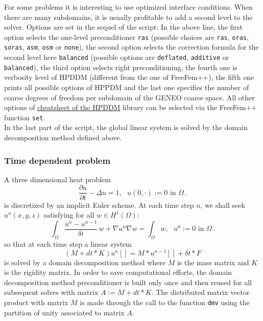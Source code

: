 For some problems it is interesting to use optimized interface conditions. When there are many subdomains, it is usually profitable to add a second level to the solver. Options are set in the sequel of the script:
\lstinput[linerange=OsmTwolevel-OsmTwolevelEnd]{\parallelScript}
 In the above line, the first option selects the one-level preconditioner \texttt{ras} (possible choices are \texttt{ras}, \texttt{oras}, \texttt{soras}, \texttt{asm}, \texttt{osm} or \texttt{none}), the second option selects the correction formula for the second level here \texttt{balanced} (possible options are \texttt{deflated}, \texttt{additive} or \texttt{balanced}), the third option selects right preconditioning, the fourth one is verbosity level of HPDDM (different from the one of FreeFem++), the fifth one prints all possible options of HPPDM and the last one specifies the number of coarse degrees of freedom per subdomain of the GENEO coarse space. All other options of \href{https://github.com/hpddm/hpddm/blob/master/doc/cheatsheet.pdf}{cheatsheet of the HPDDM} \cite{Jolivet:2014:HPD} library can be selected via the FreeFem++ function \texttt{set}.\\


In the last part of the script, the global linear system is solved by the domain decomposition method defined above. 
\lstinput[linerange=SolvePlot-SolvePlotEnd]{\parallelScript}

\subsubsection{Time dependent problem} %
\label{sub:time_dependent_problem}
\begin{example}
	A three dimensional heat problem
\[
\frac{\partial u}{\partial t} - \Delta u = 1,\ \ \ u(0,\cdot) := 0 \text{ in }\Omega\,.
\]	
is discretized by an implicit Euler scheme. At each time step $n$, we shall seek $u^n(x,y,z)$ satisfying for all $w\in H^1(\Omega)$:
\[
\int_\Omega \frac{u^n-u^{n-1}}{\delta t}\,w + \nabla u^n \nabla w = \int_\Omega w ,\ \ \ u^0 := 0 \text{ in }\Omega\,.
\]
	 so that at each time step a linear system
\[
(M+dt*K) u^n[] = M*u^{n-1}[] + \delta t*F
\]	
is solved by a domain decomposition method where $M$ is the mass matrix and $K$ is the rigidity matrix. In order to save computational efforts, the domain decomposition method preconditioner is built only once and then reused for all subsequent solves with matrix $A:=M+dt*K$. The distributed matrix vector product with matrix $M$ is made through the call to the function \texttt{dmv} using the partition of unity associated to matrix $A$. 
\end{example}

